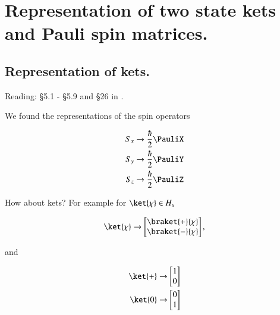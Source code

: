 %
%

\chapter{Representation of two state kets and Pauli spin matrices.}
\label{chap:qmTwoL14}
{}
\date{Oct 26, 2011}

\beginArtWithToc

%
%
\section{Representation of kets.}

Reading: \S 5.1 - \S 5.9 and \S 26 in \cite{desai2009quantum}.

We found the representations of the spin operators

\begin{align}\label{eqn:qmTwoL14:10}
S_x &\rightarrow \frac{\hbar}{2} \PauliX \\
S_y &\rightarrow \frac{\hbar}{2} \PauliY \\
S_z &\rightarrow \frac{\hbar}{2} \PauliZ
\end{align}

How about kets?  For example for $\ket{\chi} \in H_s$

\begin{equation}\label{eqn:qmTwoL14:30}
\ket{\chi} \rightarrow 
\begin{bmatrix}
\braket{+}{\chi} \\
\braket{-}{\chi}
\end{bmatrix},
\end{equation}

and 

\begin{align}\label{eqn:qmTwoL14:640}
\ket{+} &\rightarrow 
\begin{bmatrix}
1 \\
0
\end{bmatrix} \\
\ket{0} &\rightarrow 
\begin{bmatrix}
0 \\
1
\end{bmatrix}
\end{align}

